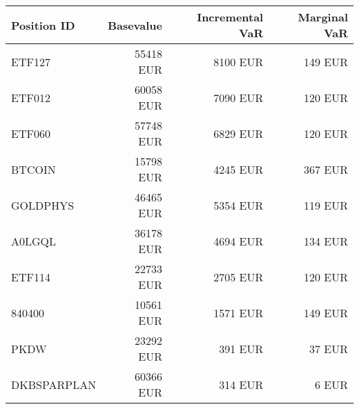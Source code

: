 \center
\begin{tabular}{l|r|r|r }
Position ID& Basevalue & Incremental VaR & Marginal VaR\\ \hline\hline
ETF127 &     55418 EUR &      8100 EUR&       149 EUR\\
ETF012 &     60058 EUR &      7090 EUR&       120 EUR\\
ETF060 &     57748 EUR &      6829 EUR&       120 EUR\\
BTCOIN &     15798 EUR &      4245 EUR&       367 EUR\\
GOLDPHYS &     46465 EUR &      5354 EUR&       119 EUR\\
A0LGQL &     36178 EUR &      4694 EUR&       134 EUR\\
ETF114 &     22733 EUR &      2705 EUR&       120 EUR\\
840400 &     10561 EUR &      1571 EUR&       149 EUR\\
PKDW &     23292 EUR &       391 EUR&        37 EUR\\
DKBSPARPLAN &     60366 EUR &       314 EUR&         6 EUR\\
\end{tabular}
